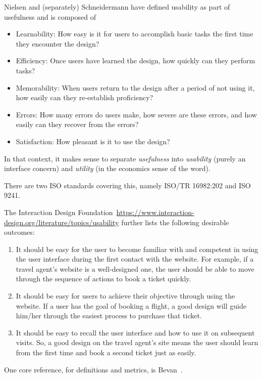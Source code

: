 \documentclass[letterpaper,cleveref]{lipics-v2019}
\theoremstyle{definition}
\begin{document}
Nielsen and (separately) Schneidermann have defined usability as part of usefulness and
is composed of
\begin{itemize}
\item Learnability: How easy is it for users to accomplish basic tasks the
  first time they encounter the design?
\item Efficiency: Once users have learned the design, how quickly can they perform tasks?
\item Memorability: When users return to the design after a period of not using
  it, how easily can they re-establish proficiency?
\item Errors: How many errors do users make, how severe are these errors, and
  how easily can they recover from the errors?
\item Satisfaction: How pleasant is it to use the design?
\end{itemize}
In that context, it makes sense to separate \emph{usefulness} into
\emph{usability} (purely an interface concern) and \emph{utility} (in the economics
sense of the word).

There are two ISO standards covering this, namely ISO/TR 16982:202 and ISO 9241. 

The Interaction Design Foundation~\url{https://www.interaction-design.org/literature/topics/usability}
further lists the following desirable outcomes:
\begin{enumerate}
\item It should be easy for the user to become familiar with and competent in using
the user interface during the first contact with the website. For example, if a
travel agent’s website is a well-designed one, the user should be able to move
through the sequence of actions to book a ticket quickly.
\item It should be easy for users to achieve their objective through using the
website. If a user has the goal of booking a flight, a good design will guide
him/her through the easiest process to purchase that ticket.
\item It should be easy to recall the user interface and how to use it on
subsequent visits. So, a good design on the travel agent’s site means the user
should learn from the first time and book a second ticket just as easily.
\end{enumerate}

One core reference, for definitions and metrics, is Bevan~\cite{bevan1995measuring}.
\end{document}
